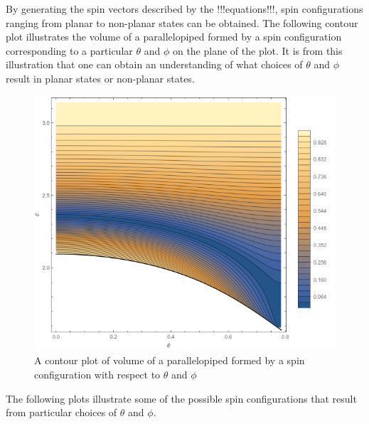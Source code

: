 By generating the spin vectors described by the !!!equations!!!, spin configurations ranging from planar to non-planar states can be obtained. The following contour plot illustrates the volume of a parallelopiped formed by a spin configuration corresponding to a particular $\theta$ and $\phi$ on the plane of the plot. It is from this illustration that one can obtain an understanding of what choices of $\theta$ and $\phi$ result in planar states or non-planar states.


\begin{figure}[ht]
	\includegraphics[width=\linewidth]{img/groundstatevol.png}
	\caption{A contour plot of volume of a parallelopiped formed by a spin configuration with respect to $\theta$ and $\phi$ }
	\label{fig:gsvol}
\end{figure}
\clearpage

The following plots illustrate some of the possible spin configurations that result from particular choices of $\theta$ and $\phi$. 

